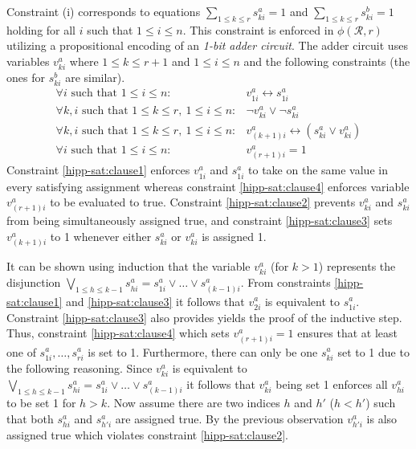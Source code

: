 \documentclass[12pt,a4paper]{article}
\begin{document}
Constraint (i) corresponds to equations $\sum_{1\leq k\leq r} s^a_{ki} = 1$ and $\sum_{1\leq k\leq r} s^b_{ki} = 1$ holding for all $i$ such that $1\leq i \leq n$.
This constraint is enforced in $\phi (\mathcal{R}, r)$ utilizing a propositional encoding of an \emph{1-bit adder circuit}.
The adder circuit uses variables $v^a_{ki}$ where $1\leq k \leq r+1$ and $1\leq i\leq n$ and the following constraints (the ones for $s^b_{ki}$ are similar).
\begin{eqnarray}
\forall i\text{ such that } 1\leq i\leq n: & v^a_{1i} \leftrightarrow s^a_{1i}\label{hipp-sat:clause1}\\
\forall k, i\text{ such that } 1\leq k \leq r,\ 1\leq i\leq n: & \neg v^a_{ki} \vee \neg s^a_{ki}\label{hipp-sat:clause2}\\
\forall k, i\text{ such that } 1\leq k \leq r,\ 1\leq i\leq n: & v^a_{(k+1)i} \leftrightarrow (s^a_{ki}\vee v^a_{ki} )\label{hipp-sat:clause3}\\
\forall i\text{ such that } 1\leq i\leq n: & v^a_{(r+1)i}=1\label{hipp-sat:clause4}
\end{eqnarray}
Constraint \eqref{hipp-sat:clause1} enforces $v^a_{1i}$ and $s^a_{1i}$ to take on the same value in every satisfying assignment whereas constraint \eqref{hipp-sat:clause4} enforces variable $v^a_{(r+1)i}$ to be evaluated to true.
Constraint \eqref{hipp-sat:clause2} prevents $v^a_{ki}$ and $s^a_{ki}$ from being simultaneously assigned true, 
and constraint \eqref{hipp-sat:clause3} sets $v^a_{(k+1)i}$ to 1 whenever either $s^a_{ki}$ or $v^a_{ki}$ is assigned 1.

It can be shown using induction that the variable $v^a_{ki}$ (for $k>1$) represents the disjunction $\bigvee_{1\leq h\leq k-1}s^a_{hi} = s^a_{1i}\vee\dots \vee s^a_{(k-1)i}$.
From constraints \eqref{hipp-sat:clause1} and \eqref{hipp-sat:clause3} it follows that $v^a_{2i}$ is equivalent to $s^a_{1i}$.
Constraint \eqref{hipp-sat:clause3} also provides yields the proof of the inductive step.
Thus, constraint \eqref{hipp-sat:clause4} which sets $v^a_{(r+1)i}=1$ ensures that at least one of $s^a_{1i},\dots , s^a_{ri}$ is set to 1.
Furthermore, there can only be one $s^a_{ki}$ set to 1 due to the following reasoning.
Since $v^a_{ki}$ is equivalent to $\bigvee_{1\leq h\leq k-1}s^a_{hi} = s^a_{1i}\vee\dots \vee s^a_{(k-1)i}$ it follows that $v^a_{ki}$ being set 1 enforces all $v^a_{hi}$ to be set 1 for $h>k$.
Now assume there are two indices $h$ and $h'$ ($h<h'$) such that both $s^a_{hi}$ and $s^a_{h'i}$ are assigned true.
By the previous observation $v^a_{h'i}$ is also assigned true which violates constraint \eqref{hipp-sat:clause2}.
\end{document}
